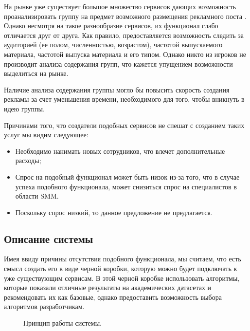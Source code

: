 \documentclass[14pt]{matmex-diploma-custom}
\begin{document}
На рынке уже существует большое множество сервисов дающих возможность проанализировать группу
на предмет возможного размещения рекламного поста \cite{smmpub2019}. Однако несмотря на
такое разнообразие сервисов, их функционал слабо отличается друг от друга. Как правило, предоставляется
возможность следить за аудиторией (ее полом, численностью, возрастом), частотой выпускаемого материала,
частотой выпуска материала и его типом. Однако никто из игроков не производит анализа содержания групп,
что кажется упущением возможности выделиться на рынке.

Наличие анализа содержания группы могло бы повысить скорость создания рекламы за счет уменьшения времени, необходимого для того, чтобы вникнуть в идею группы.

Причинами того, что создатели подобных сервисов не спешат с созданием таких услуг мы видим следующее:
\begin{itemize}
  \item Необходимо нанимать новых сотрудников, что влечет дополнительные расходы;
  \item Спрос на подобный функционал может быть низок из-за того, что в случае успеха подобного функционала, может снизиться спрос на специалистов в области SMM.
  \item Поскольку спрос низкий, то данное предложение не предлагается.
\end{itemize}

\subsection{Описание системы}

Имея ввиду причины отсутствия подобного функционала, мы считаем, что есть смысл создать его в виде
черной коробки, которую можно будет подключать к уже существующим сервисам. В этой черной коробке
использовать алгоритмы, которые показали отличные результаты на академических датасетах и рекомендовать их как базовые, однако предоставить возможность выбора алгоритмов разработчикам.

\begin{figure}[ht]
\begin{center}


\caption{
\label{app_story} Принцип работы системы.
        }
\end {center}
\end {figure}
\end{document}
